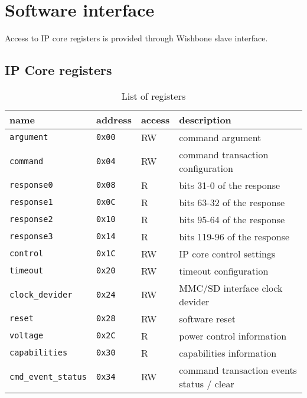 \section{Software interface}
\label{sec:sw_if}

    Access to IP core registers is provided through Wishbone slave interface. 
    
    \subsection{IP Core registers}
    \label{sec:regs}

    \begin{table}[H]
    \caption{List of registers}
        \begin{tabular}{l|l|l|l}
                \rowcolor[gray]{0.7} name & address & access & description \\ \hline \hline
                \texttt{argument} & \texttt{0x00} & RW & command argument \\ \hline
                \texttt{command} & \texttt{0x04} & RW & command transaction configuration \\ \hline
                \texttt{response0} & \texttt{0x08} & R & bits 31-0 of the response \\ \hline
                \texttt{response1} & \texttt{0x0C} & R & bits 63-32 of the response \\ \hline
                \texttt{response2} & \texttt{0x10} & R & bits 95-64 of the response \\ \hline
                \texttt{response3} & \texttt{0x14} & R & bits 119-96 of the response \\ \hline
                \texttt{control} & \texttt{0x1C} & RW & IP core control settings \\ \hline
                \texttt{timeout} & \texttt{0x20} & RW & timeout configuration \\ \hline
                \texttt{clock\_devider} & \texttt{0x24} & RW & MMC/SD interface clock devider \\ \hline
                \texttt{reset} & \texttt{0x28} & RW & software reset \\ \hline
                \texttt{voltage} & \texttt{0x2C} & R & power control information \\ \hline
                \texttt{capabilities} & \texttt{0x30} & R & capabilities information \\ \hline
                \texttt{cmd\_event\_status} & \texttt{0x34} & RW & command transaction events status / clear \\ \hline

\end{tabular}
\end{table}
